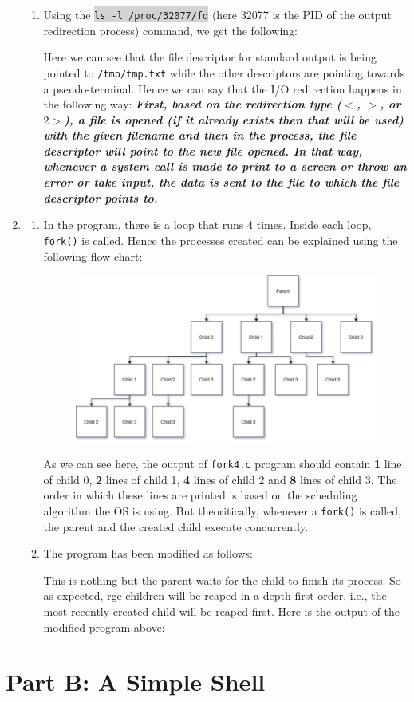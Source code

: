 \documentclass[a4paper]{article}
\newcommand{\command}[1]{\colorbox{lightgray}{\texttt{#1}}}
\begin{document}
\begin{enumerate}
\begin{enumerate}
		
		\item Using the \command{ls -l /proc/32077/fd} (here 32077 is the PID of the output redirection process) command, we get the following:
		
		Here we can see that the file descriptor for standard output is being pointed to \texttt{/tmp/tmp.txt} while the other descriptors are pointing towards a pseudo-terminal. Hence we can say that the I/O redirection happens in the following way: \textbf{\textit{First, based on the redirection type ($<$, $>$, or $2>$), a file is opened (if it already exists then that will be used) with the given filename and then in the process, the file descriptor will point to the new file opened. In that way, whenever a system call is made to print to a screen or throw an error or take input, the data is sent to the file to which the file descriptor points to.}}
	\end{enumerate}
	\item 
		\begin{enumerate}
			\item In the program, there is a loop that runs 4 times. Inside each loop, \texttt{fork()} is called. Hence the processes created can be explained using the following flow chart:
			\begin{figure}[ht]
				\centering
				\includegraphics[scale=0.4]{flowchart.png}
			\end{figure}
		
			As we can see here, the output of \texttt{fork4.c} program should contain \textbf{1} line of child 0, \textbf{2} lines of child 1, \textbf{4} lines of child 2 and \textbf{8} lines of child 3. The order in which these lines are printed is based on the scheduling algorithm the OS is using. But theoritically, whenever a \texttt{fork()} is called, the parent and the created child execute concurrently. 
			\item The program has been modified as follows:
			 
			 This is nothing but the parent waits for the child to finish its process. So as expected, rge children will be reaped in a depth-first order, i.e., the most recently created child will be reaped first. Here is the output of the modified program above:
			 
		\end{enumerate}
\end{enumerate}

\section*{Part B: A Simple Shell}
\end{document}
